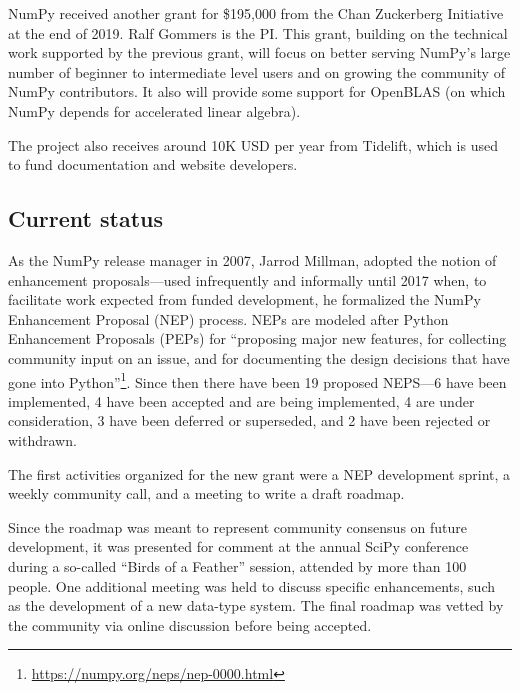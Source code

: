 NumPy received another grant for \$195,000 from the Chan Zuckerberg
Initiative at the end of 2019.
Ralf Gommers is the PI.
This grant, building on the technical work supported by the previous
grant, will focus on better serving NumPy's large number of beginner
to intermediate level users and on growing the community of NumPy
contributors.
It also will provide some support for OpenBLAS (on which NumPy depends for
accelerated linear algebra).

The project also receives around 10K USD per year from Tidelift, which is
used to fund documentation and website developers.

\subsection*{Current status}


As the NumPy release manager in 2007, Jarrod Millman, adopted the notion
of enhancement proposals---used infrequently and informally until 2017 when,
to facilitate work expected from funded development, he formalized the
NumPy Enhancement Proposal (NEP) process.  NEPs are modeled after
Python Enhancement Proposals (PEPs) for ``proposing major new
features, for collecting community input on an issue, and for
documenting the design decisions that have gone into
Python''\footnote{\url{https://numpy.org/neps/nep-0000.html}}.
Since then there have been 19 proposed NEPS---6 have been implemented,
4 have been accepted and are being implemented, 4 are under
consideration, 3 have been deferred or superseded, and 2 have been rejected
or withdrawn.

The first activities organized for the new grant were a NEP development
sprint, a weekly community call, and a meeting to write a draft roadmap.

Since the roadmap was meant to represent community consensus on future
development, it was presented for comment at the annual SciPy
conference during a so-called ``Birds of a Feather'' session, attended
by more than 100 people.  One additional meeting was held to discuss
specific enhancements, such as the development of a new data-type
system.  The final roadmap was vetted by the community via online
discussion before being accepted.

